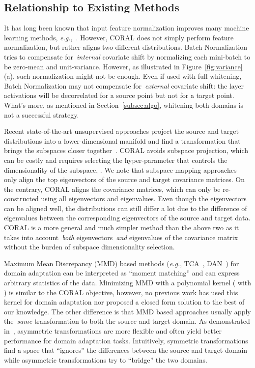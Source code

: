 \documentclass[graybox]{svmult}
\newcommand\eg{\emph{e.g.}}
\begin{document}
\subsection{Relationship to Existing Methods} 
It has long been known that input feature normalization improves many machine learning methods, \eg,~\cite{batchnorm}. However, CORAL does not simply perform feature normalization, but rather aligns two different distributions. Batch Normalization~\cite{batchnorm} tries to compensate for~\emph{internal} covariate shift by normalizing each mini-batch to be zero-mean and unit-variance. However, as illustrated in Figure~\ref{fig:variance}(a), such normalization might not be enough. Even if used with full whitening, Batch Normalization may not compensate for~\emph{external} covariate shift: the layer activations will be decorrelated for a source point but not for a target point. What's more, as mentioned in Section~\ref{subsec:algo}, whitening both domains is not a successful strategy.

Recent state-of-the-art unsupervised approaches project the source and target distributions into a lower-dimensional manifold and find a transformation that brings the subspaces closer together~\cite{gopalan-iccv11,gfk,sa,outlooks}. CORAL avoids subspace projection, which can be costly and requires selecting the hyper-parameter that controls the dimensionality of the subspace, . We note that subspace-mapping approaches~\cite{outlooks,sa} only align the top  eigenvectors of the source and target covariance matrices. On the contrary, CORAL aligns the covariance matrices, which can only be re-constructed using all eigenvectors and eigenvalues. Even though the eigenvectors can be aligned well, the distributions can still differ a lot due to the difference of eigenvalues between the corresponding eigenvectors of the source and target data. CORAL is a more general and much simpler method than the above two as it takes into account~\emph{both} eigenvectors~\emph{and} eigenvalues of the covariance matrix without the burden of subspace dimensionality selection. 

Maximum Mean Discrepancy (MMD) based methods (\eg, TCA~\cite{tca}, DAN~\cite{dan_long15}) for domain adaptation can be interpreted as ``moment matching'' and can express arbitrary statistics of the data. Minimizing MMD with a polynomial kernel ( with ) is similar to the CORAL objective, however, no previous work has used this kernel for domain adaptation nor proposed a closed form solution to the best of our knowledge. 
The other difference is that MMD based approaches usually apply the~\emph{same} transformation to both the source and target domain. As demonstrated in~\cite{ref:kulis_cvpr11,outlooks,sa}, asymmetric transformations are more flexible and often yield better performance for domain adaptation tasks. Intuitively, symmetric transformations find a space that ``ignores'' the differences between the source and target domain while asymmetric transformations try to ``bridge'' the two domains.
\end{document}
